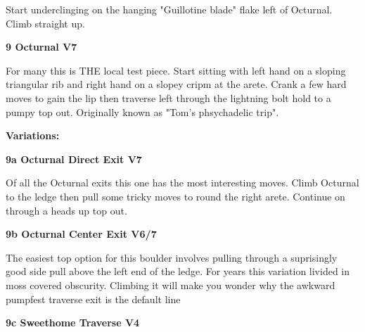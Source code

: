 \begin{multicols}{2}
\begin{minipage}{\linewidth}
					\begin{adjustwidth}{0.5cm}{}				
					Start underclinging on the hanging "Guillotine blade" flake left of Octurnal. Climb straight up.
					\end{adjustwidth}
					\end{minipage}
					\begin{minipage}{\linewidth}	
					\label{rt:Octurnal}
\colorbox{Goldenrod!50}{
\parbox{0.95\textwidth}{
\textbf{
9 Octurnal V7     
}
}
}

					\begin{adjustwidth}{0.5cm}{}				
					For many this is THE local test piece. Start sitting with left hand on a sloping triangular rib and right hand on a slopey cripm at the arete. Crank a few hard moves to gain the lip then traverse left through the lightning bolt hold to a pumpy top out. Originally known as "Tom's phsychadelic trip".
					\end{adjustwidth}
					\end{minipage}
						\begin{adjustwidth}{0.5cm}{}				
						\textbf{Variations:} \newline
							\begin{minipage}{\linewidth}	
							\label{vr:Octurnal Direct Exit}
\colorbox{Goldenrod!50}{
\parbox{0.95\textwidth}{
\textbf{
9a Octurnal Direct Exit V7     
}
}
}

							\begin{adjustwidth}{0.5cm}{}				
							Of all the Octurnal exits this one has the most interesting moves. Climb Octurnal to the ledge then pull some tricky moves to round the right arete. Continue on through a heads up top out.
							\end{adjustwidth}
							\end{minipage}
							\begin{minipage}{\linewidth}	
							\label{vr:Octurnal Center Exit}
\colorbox{Goldenrod!50}{
\parbox{0.95\textwidth}{
\textbf{
9b Octurnal Center Exit V6/7    
}
}
}

							\begin{adjustwidth}{0.5cm}{}				
							The easiest top option for this boulder involves pulling through a suprisingly good side pull above the left end of the ledge. For years this variation livided in moss covered obscurity. Climbing it will make you wonder why the awkward pumpfest traverse exit is the default line
							\end{adjustwidth}
							\end{minipage}
							\begin{minipage}{\linewidth}	
							\label{vr:Sweethome Traverse}
\colorbox{RoyalBlue!20}{
\parbox{0.95\textwidth}{
\textbf{
9c Sweethome Traverse V4    
}
}
}


\end{minipage}
\end{adjustwidth}
\end{multicols}
